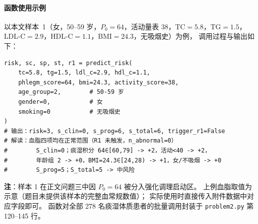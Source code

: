 \paragraph{函数使用示例}
以本文样本~1（女，50--59 岁，$P_0=64$，活动量表 38，TC$=5.8$，TG$=1.5$，
LDL-C$=2.9$，HDL-C$=1.1$，BMI$=24.3$，无吸烟史）为例，
调用过程与输出如下：

\begin{lstlisting}[caption={样本 1 风险预警调用示例},
                   label={lst:example-call}]
risk, sc, sp, st, r1 = predict_risk(
    tc=5.8, tg=1.5, ldl_c=2.9, hdl_c=1.1,
    phlegm_score=64, bmi=24.3, activity_score=38,
    age_group=2,        # 50-59 岁
    gender=0,           # 女
    smoking=0           # 无吸烟史
)
# 输出：risk=3, s_clin=0, s_prog=6, s_total=6, trigger_r1=False
# 解读：血脂四项均在正常范围（R1 未触发，n_abnormal=0）
#        S_clin=0；痰湿积分 64∈[60,79] -> +2，活动<40 -> +2，
#        年龄组 2 -> +0，BMI=24.3∈[24,28) -> +1，女/不吸烟 -> +0
#        S_prog=5；S_total=5 -> 中风险
\end{lstlisting}

\noindent\textbf{注}：样本 1 在正文问题三中因 $P_0=64$ 被分入强化调理启动区。
上例血脂取值为示意（题目未提供该样本的完整血常规数值）；
实际使用时直接传入附件数据中对应字段即可。
函数对全部 278 名痰湿体质患者的批量调用封装于 \texttt{problem2.py} 第 120--145 行。

